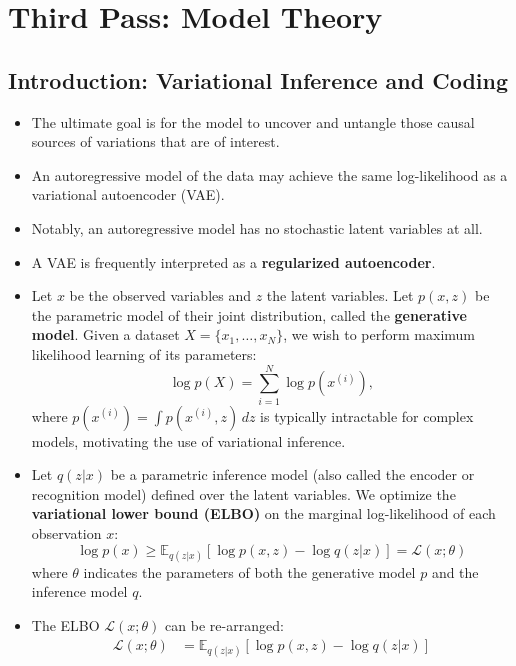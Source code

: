 \documentclass[12pt]{article}
\begin{document}
\section{Third Pass: Model Theory}
\subsection{Introduction: Variational Inference and Coding}
\begin{itemize}
    \item The ultimate goal is for the model to uncover and untangle those causal sources of variations that are of interest.
    \item An autoregressive model of the data may achieve the same log-likelihood as a variational autoencoder (VAE).
    \item Notably, an autoregressive model has no stochastic latent variables at all.
    \item A VAE is frequently interpreted as a \textbf{regularized autoencoder}.
    \item Let $x$ be the observed variables and $z$ the latent variables. Let $p(x, z)$ be the parametric model of their joint distribution, called the \textbf{generative model}. Given a dataset $X = \{x_1, \ldots, x_N\}$, we wish to perform maximum likelihood learning of its parameters:
\begin{equation}
    \log p(X) = \sum_{i=1}^N \log p(x^{(i)}),
\end{equation}
where $p(x^{(i)}) = \int p(x^{(i)}, z) \, dz$ is typically intractable for complex models, motivating the use of variational inference.
    \item Let $q(z|x)$ be a parametric inference model (also called the encoder or recognition model) defined over the latent variables. We optimize the \textbf{variational lower bound (ELBO)} on the marginal log-likelihood of each observation $x$:
\begin{equation}
    \log p(x) \geq \mathbb{E}_{q(z|x)} \left[ \log p(x, z) - \log q(z|x) \right] = \mathcal{L}(x; \theta)
\end{equation}
where $\theta$ indicates the parameters of both the generative model $p$ and the inference model $q$.
    \item The ELBO $\mathcal{L}(x; \theta)$ can be re-arranged:
    \begin{equation}
        \begin{aligned}
            \mathcal{L}(x; \theta) &= \mathbb{E}_{q(z|x)} \left[ \log p(x, z) - \log q(z|x) \right] \\

\end{aligned}
\end{equation}
\end{itemize}
\end{document}
